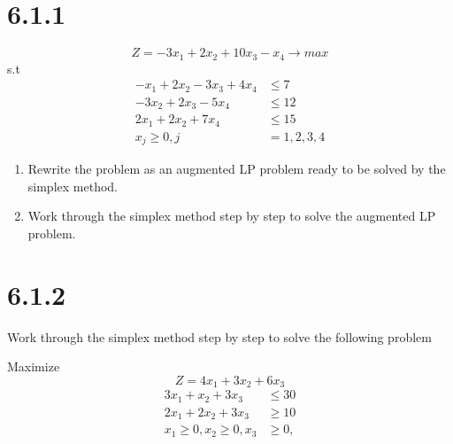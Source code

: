 \documentclass{article}
\begin{document}
\section*{6.1.1}
\begin{equation*}
  Z = -3x_{1} + 2x_{2} + 10x_{3} - x_{4} \rightarrow max
\end{equation*}
s.t
\begin{align*}
-x_{1} + 2x_{2} - 3x_{3} + 4x_{4} &\leq 7\\
       - 3x_{2} + 2x_{3} - 5x_{4} &\leq 12\\
2x_{1} + 2x_{2}          + 7x_{4} &\leq 15\\
x_{j} \geq 0, j &= 1, 2, 3, 4
\end{align*}
\begin{enumerate}
  \item Rewrite the problem as an augmented LP problem ready to be solved by the simplex method.
  \item Work through the simplex method step by step to solve the augmented LP problem.
\end{enumerate}

\section*{6.1.2}
Work through the simplex method step by step to solve the following problem

Maximize
\begin{equation*}
  Z = 4x_{1} + 3x_{2} + 6x_{3}
\end{equation*}
\begin{align*}
  3x_{1} + x_{2} + 3x_{3} &\leq 30\\
  2x_{1} + 2x_{2} + 3x_{3} &\geq 10\\
  x_{1} \geq 0, x_{2} \geq 0, x_{3} &\geq 0,
\end{align*}
\end{document}
